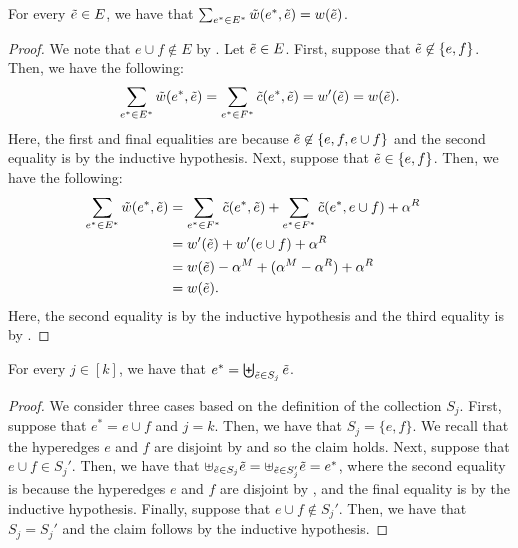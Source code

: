     \begin{claim}\label{claim:weak-to-strong:correctness:main:hyperedge-merge:property1}
        For every $\Tilde{e} \in E$, we have that $\sum_{e^* \in E^*}\Tilde{w}(e^*, \Tilde{e}) = w(\Tilde{e})$.
    \end{claim}
    \begin{proof}
        We note that $e \cup f \not \in E$  by . Let $\Tilde{e} \in E$. First, suppose that $\Tilde{e} \not \in \{e, f\}$. Then, we have the following:
        $$\sum_{e^* \in E^*}\Tilde{w}(e^*, \Tilde{e}) = \sum_{e^* \in F^*}\Tilde{c}(e^*, \Tilde{e}) = w'(\Tilde{e}) = w(\Tilde{e}).$$
        Here, the first and final equalities are because $\Tilde{e} \not \in \{e, f, e\cup f\}$ and the second equality is by the inductive hypothesis. Next, suppose that $\Tilde{e} \in \{e, f\}$. Then, we have the following:
        \begin{align*}
            \sum_{e^* \in E^*}\Tilde{w}(e^*, \Tilde{e})&= \sum_{e^* \in F^*}\Tilde{c}(e^*, \Tilde{e}) + \sum_{e^* \in F^*}\Tilde{c}(e^*, e\cup f) + \alpha^R&\\
            &= w'(\Tilde{e}) + w'(e\cup f) + \alpha^R&\\
            & = w(\Tilde{e}) - \alpha^M + (\alpha^M - \alpha^R) + \alpha^R&\\
            &= w(\Tilde{e}).  &
        \end{align*}
        Here, the second equality is by the inductive hypothesis and the third equality is by .
    \end{proof}

\begin{claim}\label{claim:weak-to-strong:correctness:main:hyperedge-merge:property2}
    For every $j \in [k]$, we have that $e^* = \biguplus_{\Tilde{e} \in S_j}\Tilde{e}$.
\end{claim}
\begin{proof}
    We consider three cases based on the definition of the collection $S_j$. First, suppose that $e^* = e \cup f$ and $j = k$. Then, we have that $S_j = \{e, f\}$. We recall that the hyperedges $e$ and $f$ are disjoint by  and so the claim holds. Next, suppose that $e \cup f \in S_j'$. Then, we have that $\uplus_{\Tilde{e} \in S_j} \Tilde{e} = \uplus_{\Tilde{e} \in S_j'} \Tilde{e} = e^*$, where the second equality is  because the hyperedges $e$ and $f$ are disjoint by , and the final equality is by the inductive hypothesis. Finally, suppose that $e\cup f \not \in S_j'$. Then, we have that $S_j = S_j'$ and the claim follows by the inductive hypothesis.
\end{proof}

